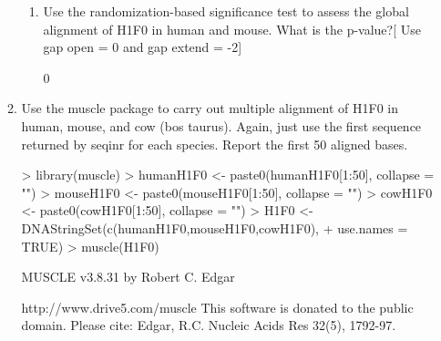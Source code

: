 \documentclass[12pt,a4paper]{paper}
\begin{document}
\begin{enumerate}
\begin{enumerate}
\begin{enumerate}
\item Use the randomization-based significance test to assess the global alignment of H1F0 in human and mouse. What is the p-value?[ Use gap open = 0 and gap extend = -2]
\begin{Schunk}
\begin{Soutput}
[1] 0
\end{Soutput}
\end{Schunk}
\end{enumerate}
\item Use the muscle package to carry out multiple alignment of H1F0 in human, mouse, and cow (bos taurus). Again, just use the first sequence returned by seqinr for each species. Report the first 50 aligned bases.
\begin{Schunk}
\begin{Sinput}
> library(muscle)
> humanH1F0 <- paste0(humanH1F0[1:50], collapse = "")
> mouseH1F0 <- paste0(mouseH1F0[1:50], collapse = "")
> cowH1F0 <- paste0(cowH1F0[1:50], collapse = "")
> H1F0 <- DNAStringSet(c(humanH1F0,mouseH1F0,cowH1F0), 
+                      use.names = TRUE)
> muscle(H1F0)
\end{Sinput}
\begin{Soutput}
MUSCLE v3.8.31 by Robert C. Edgar

http://www.drive5.com/muscle
This software is donated to the public domain.
Please cite: Edgar, R.C. Nucleic Acids Res 32(5), 1792-97.


\end{Soutput}
\end{Schunk}
\end{enumerate}
\end{enumerate}
\end{document}
